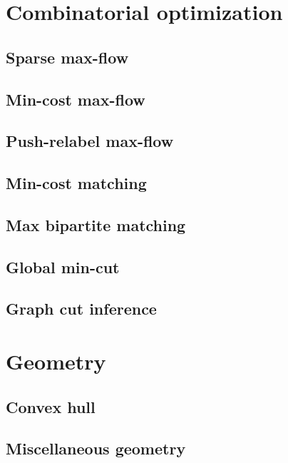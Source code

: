 \documentclass[twocolumn]{article}
\begin{document}
\tableofcontents

\section{Combinatorial optimization}
\subsection{Sparse max-flow}

\subsection{Min-cost max-flow}

\subsection{Push-relabel max-flow}

\subsection{Min-cost matching}

\subsection{Max bipartite matching}

\subsection{Global min-cut}

\subsection{Graph cut inference}


\section{Geometry}
\subsection{Convex hull}

\subsection{Miscellaneous geometry}

\end{document}
